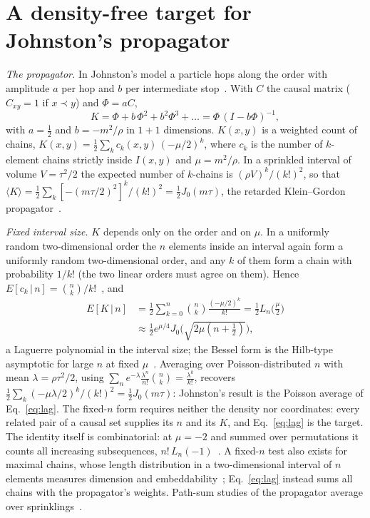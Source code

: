 \documentclass[prd,twocolumn,superscriptaddress,nofootinbib,amsmath,amssymb,floatfix]{revtex4-2}
\begin{document}
\section{A density-free target for Johnston's propagator}\label{sec:prop}
\emph{The propagator.} In Johnston's model a particle hops along the order with amplitude $a$ per hop and $b$ per intermediate stop~\cite{Johnston08}. With $C$ the causal matrix ($C_{xy}=1$ if $x\prec y$) and $\Phi=aC$,
\begin{equation}
K=\Phi+b\,\Phi^2+b^2\Phi^3+\dots=\Phi\,(I-b\Phi)^{-1},
\end{equation}
with $a=\tfrac12$ and $b=-m^2/\rho$ in $1+1$ dimensions. $K(x,y)$ is a weighted count of chains, $K(x,y)=\tfrac12\sum_k c_k(x,y)\,(-\mu/2)^k$, where $c_k$ is the number of $k$-element chains strictly inside $I(x,y)$ and $\mu=m^2/\rho$. In a sprinkled interval of volume $V=\tau^2/2$ the expected number of $k$-chains is $(\rho V)^k/(k!)^2$, so that $\langle K\rangle=\tfrac12\sum_k[-(m\tau/2)^2]^k/(k!)^2=\tfrac12J_0(m\tau)$, the retarded Klein--Gordon propagator~\cite{Johnston08}.

\emph{Fixed interval size.} $K$ depends only on the order and on $\mu$. In a uniformly random two-dimensional order the $n$ elements inside an interval again form a uniformly random two-dimensional order, and any $k$ of them form a chain with probability $1/k!$ (the two linear orders must agree on them). Hence $E[c_k\,|\,n]=\binom nk/k!$~\cite{Pinsky06}, and
\begin{equation}
\begin{aligned}
E[K\,|\,n]&=\frac12\sum_{k=0}^n\binom nk\frac{(-\mu/2)^k}{k!}=\frac12L_n\!\Big(\frac\mu2\Big)\\
&\approx\frac12e^{\mu/4}J_0\Big(\sqrt{2\mu(n+\tfrac12)}\Big),
\end{aligned}
\label{eq:lag}
\end{equation}
a Laguerre polynomial in the interval size; the Bessel form is the Hilb-type asymptotic for large $n$ at fixed $\mu$~\cite{Szego39}. Averaging over Poisson-distributed $n$ with mean $\lambda=\rho\tau^2/2$, using $\sum_ne^{-\lambda}\frac{\lambda^n}{n!}\binom nk=\frac{\lambda^k}{k!}$, recovers $\tfrac12\sum_k(-\mu\lambda/2)^k/(k!)^2=\tfrac12J_0(m\tau)$: Johnston's result is the Poisson average of Eq.~\eqref{eq:lag}. The fixed-$n$ form requires neither the density nor coordinates: every related pair of a causal set supplies its $n$ and its $K$, and Eq.~\eqref{eq:lag} is the target. The identity itself is combinatorial: at $\mu=-2$ and summed over permutations it counts all increasing subsequences, $n!\,L_n(-1)$~\cite{LifschitzPittel81,OEIS}. A fixed-$n$ test also exists for maximal chains, whose length distribution in a two-dimensional interval of $n$ elements measures dimension and embeddability~\cite{ABP18}; Eq.~\eqref{eq:lag} instead sums all chains with the propagator's weights. Path-sum studies of the propagator average over sprinklings~\cite{Shuman23,KastratiHinrichsen26}.
\end{document}
